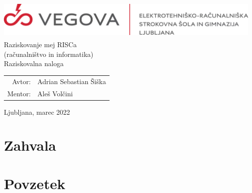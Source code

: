 \documentclass[12pt]{article}
\begin{document}
\linespread{1.25}
\begin{titlepage}
  \begin{center}
    \includegraphics[height=2cm]{slike/vegova.png}\\
    \Huge
    \vspace*{6cm}
    Raziskovanje mej RISCa\\
    \Large
    (računalništvo in informatika)\\
    Raziskovalna naloga\\
  \end{center}
  \vspace{8cm}
  \begin{tabular}{rl}
Avtor: & Adrian Sebastian Šiška\\
Mentor: & Aleš Volčini
    \end{tabular}
    \vspace{1cm}
    \begin{center}
      Ljubljana, marec 2022
    \end{center}
\end{titlepage}

\pagebreak
{}

\tableofcontents

\pagebreak

\listoffigures

\pagebreak

\section{Zahvala}

\pagebreak

\section{Povzetek}
\pagebreak
\end{document}
